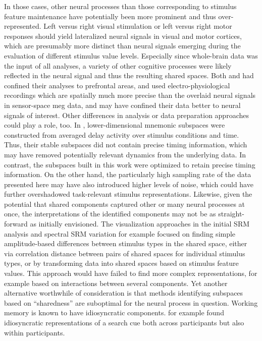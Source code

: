 In those cases, other neural processes than those corresponding to stimulus feature maintenance have potentially been more prominent and thus over-represented.
Left versus right visual stimulation or left versus right motor responses should yield lateralized neural signals in visual and motor cortices, which are presumably more distinct than neural signals emerging during the evaluation of different stimulus value levels.
Especially since whole-brain data was the input of all analyses, a variety of other cognitive processes were likely reflected in the neural signal and thus the resulting shared spaces.
Both \citet{machens2010functional} and \citet{murray2017stable} had confined their analyses to prefrontal areas, and used electro-physiological recordings which are spatially much more precise than the overlaid neural signals in sensor-space \gls{meg} data, and may have confined their data better to neural signals of interest.
Other differences in analysis or data preparation approaches could play a role, too.
In \citet{murray2017stable}, lower-dimensional mnemonic subspaces were constructed from averaged delay activity over stimulus conditions and time.
Thus, their stable subspaces did not contain precise timing information, which may have removed potentially relevant dynamics from the underlying data.
In contrast, the subspaces built in this work were optimized to retain precise timing information.
On the other hand, the particularly high sampling rate of the data presented here may have also introduced higher levels of noise, which could have further overshadowed task-relevant stimulus representations.
Likewise, given the potential that shared components captured other or many neural processes at once, the interpretations of the identified components may not be as straight-forward as initially envisioned.
The visualization approaches in the initial \gls{SRM} analysis and spectral \gls{SRM} variation for example focused on finding simple amplitude-based differences between stimulus types in the shared space, either via correlation distance between pairs of shared spaces for individual stimulus types, or by transforming data into shared spaces based on stimulus feature values.
This approach would have failed to find more complex representations, for example based on interactions between several components.
Yet another alternative worthwhile of consideration is that methods identifying subspaces based on ``sharedness'' are suboptimal for the neural process in question.
Working memory is known to have idiosyncratic components.
\citet{lee2017idiosyncratic} for example found idiosyncratic representations of a search cue both across participants but also within participants.
